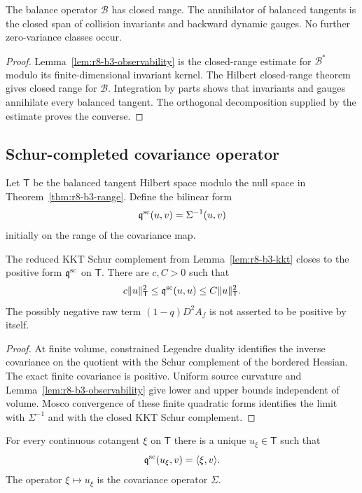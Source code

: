 \begin{theorem}
\label{thm:r8-b3-range}
The balance operator $\mathcal B$ has closed range.  The annihilator of balanced
tangents is the closed span of collision invariants and backward dynamic
gauges.  No further zero-variance classes occur.
\end{theorem}

\begin{proof}
Lemma~\ref{lem:r8-b3-observability} is the closed-range estimate for
$\mathcal B^*$ modulo its finite-dimensional invariant kernel.  The Hilbert
closed-range theorem gives closed range for $\mathcal B$.  Integration by parts
shows that invariants and gauges annihilate every balanced tangent.  The
orthogonal decomposition supplied by the estimate proves the converse.
\end{proof}

\subsection{Schur-completed covariance operator}

Let $\mathsf T$ be the balanced tangent Hilbert space modulo the null space in
Theorem~\ref{thm:r8-b3-range}.  Define the bilinear form
\[
 \mathfrak q^{\rm sc}(u,v)=\Sigma^{-1}(u,v)
\]
initially on the range of the covariance map.

\begin{theorem}
\label{thm:r8-b3-schur}
The reduced KKT Schur complement from
Lemma~\ref{lem:r8-b3-kkt} closes to the positive form
$\mathfrak q^{\rm sc}$ on $\mathsf T$.  There are $c,C>0$ such that
\[
 c\|u\|_{\mathsf T}^2\le\mathfrak q^{\rm sc}(u,u)
 \le C\|u\|_{\mathsf T}^2.
\]
The possibly negative raw term $(1-q)D^2A_f$ is not asserted to be positive by
itself.
\end{theorem}

\begin{proof}
At finite volume, constrained Legendre duality identifies the inverse
covariance on the quotient with the Schur complement of the bordered Hessian.
The exact finite covariance is positive.  Uniform source curvature and
Lemma~\ref{lem:r8-b3-observability} give lower and upper bounds independent of
volume.  Mosco convergence of these finite quadratic forms identifies the
limit with $\Sigma^{-1}$ and with the closed KKT Schur complement.
\end{proof}

\begin{corollary}
\label{cor:r8-b3-lax}
For every continuous cotangent $\xi$ on $\mathsf T$ there is a unique
$u_\xi\in\mathsf T$ such that
\[
 \mathfrak q^{\rm sc}(u_\xi,v)=\langle\xi,v\rangle.
\]
The operator $\xi\mapsto u_\xi$ is the covariance operator $\Sigma$.
\end{corollary}

